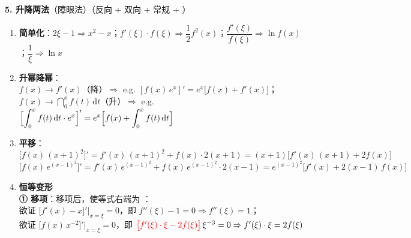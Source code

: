 \documentclass[a4paper,12pt]{article}
\begin{document}
\begin{minipage}[t]{0.46\textwidth}
        \textbf{5. 升降两法}（障眼法）（反向 + 双向 + 常规 + {\color{red}{经典}}）
        \begin{enumerate}[label=\alph*., leftmargin=2em, itemsep=0.8em]
            \item \textbf{简单化}：$2\xi - 1 \Rightarrow x^{2} - x$；\quad $f'(\xi)\cdot f(\xi) \Rightarrow \dfrac{1}{2}f^{2}(x)$；\quad $\dfrac{f'(\xi)}{f(\xi)} \Rightarrow \ln f(x)$；\quad $\dfrac{1}{\xi} \Rightarrow \ln x$
            \item \textbf{升幂降幂}：\\
                  $f(x) \to f'(x)$（降）$\Rightarrow$ e.g. $[f(x)\,e^{x}]' = e^{x}\bigl[f(x) + f'(x)\bigr]$；\\
                  $f(x) \to \dint_{0}^{x} f(t)\,\mathrm{d}t$（升）$\Rightarrow$ e.g. $\Bigl[\displaystyle\int_{0}^{x} f(t)\,\mathrm{d}t \cdot e^{x}\Bigr]' = e^{x}\Bigl[f(x) + \displaystyle\int_{0}^{x} f(t)\,\mathrm{d}t\Bigr]$
            \item \textbf{平移}：\\
                  $\bigl[f(x)\,(x + 1)^{2}\bigr]' = f'(x)\,(x + 1)^{2} + f(x)\cdot 2(x + 1) = (x + 1)\bigl[f'(x)\,(x + 1) + 2f(x)\bigr]$\\[0.3em]
                  $\bigl[f(x)\,e^{(x - 1)^{2}}\bigr]' = f'(x)\,e^{(x - 1)^{2}} + f(x)\,e^{(x - 1)^{2}}\cdot 2(x - 1) = e^{(x - 1)^{2}}\bigl[f'(x) + 2(x - 1)\,f(x)\bigr]$
            \item \textbf{恒等变形}\\
                  \textbf{① 移项}：移项后，使等式右端为 {\color{red}{0}}：\\
                  欲证 $\bigl[f'(x) - x\bigr]'\bigr|_{x = \xi} = 0$，即 $f''(\xi) - 1 = 0 \Rightarrow f''(\xi) = 1$；\\
                  欲证 $\bigl[f(x)\,x^{-2}\bigr]'\bigr|_{x = \xi} = 0$，即 ${\color{red}{\bigl[f'(\xi)\cdot \xi - 2f(\xi)\bigr]}}\,\xi^{-3} = 0 \Rightarrow f'(\xi)\cdot\xi = 2f(\xi)$
        \end{enumerate}
    \end{minipage}
    \hfill

    \newpage
\end{document}
